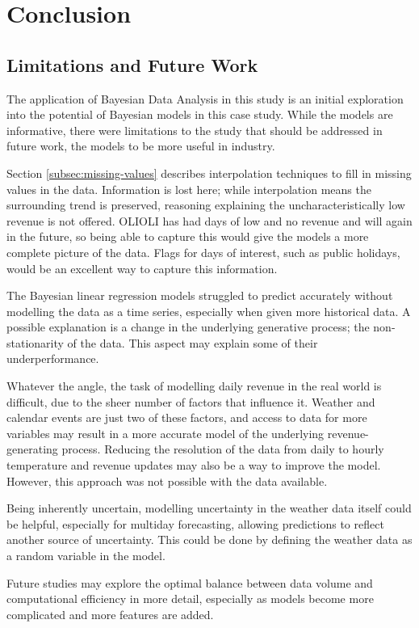 \section{Conclusion}

\subsection{Limitations and Future Work}
The application of Bayesian Data Analysis in this study is an initial
exploration into the potential of Bayesian models in this case study. While the
models are informative, there were limitations to the study that should be
addressed in future work, the models to be more useful in industry.

Section \ref{subsec:missing-values} describes interpolation techniques to fill
in missing values in the data. Information is lost here; while interpolation
means the surrounding trend is preserved, reasoning explaining the
uncharacteristically low revenue is not offered. OLIOLI has had days of low
and no revenue and will again in the future, so being able to capture this
would give the models a more complete picture of the data. Flags for days of
interest, such as public holidays, would be an excellent way to capture this
information.

The Bayesian linear regression models struggled to predict accurately without
modelling the data as a time series, especially when given more historical
data. A possible explanation is a change in the underlying generative
process; the non-stationarity of the data. This aspect may explain some of
their underperformance. 

Whatever the angle, the task of modelling daily revenue in the real world is
difficult, due to the sheer number of factors that influence it. Weather and
calendar events are just two of these factors, and access to data for more
variables may result in a more accurate model of the underlying
revenue-generating process. Reducing the resolution of the data from daily to
hourly temperature and revenue updates may also be a way to improve the model.
However, this approach was not possible with the data available.

Being inherently uncertain, modelling uncertainty in the weather data itself
could be helpful, especially for multiday forecasting, allowing predictions to
reflect another source of uncertainty. This could be done by defining the
weather data as a random variable in the model.

Future studies may explore the optimal balance between data volume and
computational efficiency in more detail, especially as models become more
complicated and more features are added.

